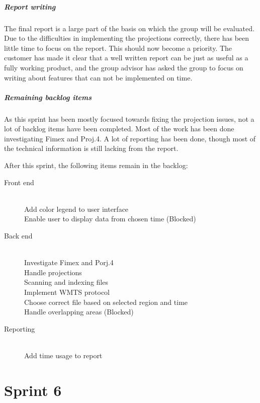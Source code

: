 \documentclass[11pt,a4paper,titlepage,oneside]{report}
\begin{document}
\paragraph{Report writing}
The final report is a large part of the basis on which the group will be evaluated. Due to the difficulties in implementing the projections correctly, there has been little time to focus on the report. This should now become a priority. The customer has made it clear that a well written report can be just as useful as a fully working product, and the group advisor has asked the group to focus on writing about features that can not be implemented on time. 

\paragraph{Remaining backlog items}
As this sprint has been mostly focused towards fixing the projection issues, not a lot of backlog items have been completed. Most of the work has been done investigating \gls{Fimex} and Proj.4. A lot of reporting has been done, though most of the technical information is still lacking from the report. 

After this sprint, the following items remain in the backlog:

\begin{description}
	\item[Front end] \hfill \\
	Add color legend to user interface \hfill \\
	Enable user to display data from chosen time (Blocked)
	\item[Back end] \hfill \\
	Investigate \gls{Fimex} and Porj.4 \hfill \\
	Handle projections \hfill \\
	Scanning and indexing files \hfill \\
	Implement \gls{WMTS} \gls{protocol} \hfill \\
	Choose correct file based on selected region and time \hfill \\
	Handle overlapping areas (Blocked)
	\item[Reporting] \hfill \\
	Add time usage to report
\end{description}

\chapter{Sprint 6}
\end{document}
